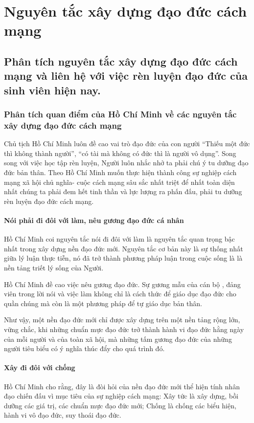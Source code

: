 \section{Nguyên tắc xây dựng đạo đức cách mạng}

\subsection{Phân tích nguyên tắc xây dựng đạo đức cách mạng và liên hệ với việc rèn luyện đạo đức của sinh viên hiện nay.}

\subsubsection{Phân tích quan điểm của Hồ Chí Minh về các nguyên tắc xây dựng đạo đức cách mạng}

Chủ tịch Hồ Chí Minh luôn đề cao vai trò đạo đức của con người ``Thiếu một đức thì không thành người'', ``có tài mà không có đức thì là người vô dụng''. Song song với việc học tập rèn luyện, Người luôn nhắc nhở ta phải chú ý tu dưỡng đạo đức bản thân. Theo Hồ Chí Minh muốn thực hiện thành công sự nghiệp cách mạng xã hội chủ nghĩa- cuộc cách mạng sâu sắc nhất triệt để nhất toàn diện nhất chúng ta phải đem hết tinh thần và lực lượng ra phấn đấu, phải tu dưỡng rèn luyện đạo đức cách mạng.

\paragraph{Nói phải đi đôi với làm, nêu gương đạo đức cá nhân}
Hồ Chí Minh coi nguyên tắc nói đi đôi với làm là nguyên tắc quan trọng bậc nhất trong xây dựng nền đạo đức mới. Nguyên tắc cơ bản này là sự thống nhất giữa lý luận thực tiễn, nó đã trở thành phương pháp luận trong cuộc sống là là nền tảng triết lý sống của Người.

Hồ Chí Minh đề cao việc nêu gương đạo đức. Sự gương mẫu của cán bộ , đảng viên trong lời nói và việc làm không chỉ là cách thức để giáo dục đạo đức cho quần chúng mà còn là một phương pháp để tự giáo dục bản thân.

Như vậy, một nền đạo đức mới chỉ được xây dựng trên một nền tảng rộng lớn, vững chắc, khi những chuẩn mực đạo đức trở thành hành vi đạo đức hằng ngày của mỗi người và của toàn xã hội, mà những tấm gương đạo đức của những người tiêu biểu có ý nghĩa thúc đẩy cho quá trình đó.

\paragraph{Xây đi đôi với chống}
Hồ Chí Minh cho rằng, đây là đòi hỏi của nền đạo đức mới thể hiện tính nhân đạo chiến đấu vì mục tiêu của sự nghiệp cách mạng: Xây tức là xây dựng, bồi dưỡng các giá trị, các chuẩn mực đạo đức mới; Chống là chống các biểu hiện, hành vi vô đạo đức, suy thoái đạo đức.

